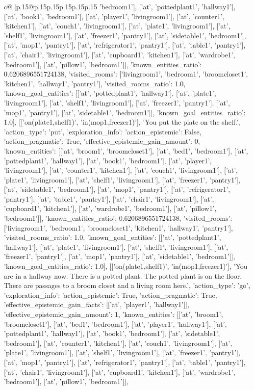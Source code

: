 \documentclass{article}
\begin{document}
{\begin{supertabular}{c@{$\;$}|p{.15\linewidth}@{}p{.15\linewidth}p{.15\linewidth}p{.15\linewidth}p{.15\linewidth}p{.15\linewidth}}
{{{'bedroom1'], ['at', 'pottedplant1', 'hallway1'], ['at', 'book1', 'bedroom1'], ['at', 'player1', 'livingroom1'], ['at', 'counter1', 'kitchen1'], ['at', 'couch1', 'livingroom1'], ['at', 'plate1', 'livingroom1'], ['at', 'shelf1', 'livingroom1'], ['at', 'freezer1', 'pantry1'], ['at', 'sidetable1', 'bedroom1'], ['at', 'mop1', 'pantry1'], ['at', 'refrigerator1', 'pantry1'], ['at', 'table1', 'pantry1'], ['at', 'chair1', 'livingroom1'], ['at', 'cupboard1', 'kitchen1'], ['at', 'wardrobe1', 'bedroom1'], ['at', 'pillow1', 'bedroom1']], 'known_entities_ratio': 0.6206896551724138, 'visited_rooms': ['livingroom1', 'bedroom1', 'broomcloset1', 'kitchen1', 'hallway1', 'pantry1'], 'visited_rooms_ratio': 1.0, 'known_goal_entities': [['at', 'pottedplant1', 'hallway1'], ['at', 'plate1', 'livingroom1'], ['at', 'shelf1', 'livingroom1'], ['at', 'freezer1', 'pantry1'], ['at', 'mop1', 'pantry1'], ['at', 'sidetable1', 'bedroom1']], 'known_goal_entities_ratio': 1.0}}], [['on(plate1,shelf1)', 'in(mop1,freezer1)'], 'You put the plate on the shelf.', {'action_type': 'put', 'exploration_info': {'action_epistemic': False, 'action_pragmatic': True, 'effective_epistemic_gain_amount': 0, 'known_entities': [['at', 'broom1', 'broomcloset1'], ['at', 'bed1', 'bedroom1'], ['at', 'pottedplant1', 'hallway1'], ['at', 'book1', 'bedroom1'], ['at', 'player1', 'livingroom1'], ['at', 'counter1', 'kitchen1'], ['at', 'couch1', 'livingroom1'], ['at', 'plate1', 'livingroom1'], ['at', 'shelf1', 'livingroom1'], ['at', 'freezer1', 'pantry1'], ['at', 'sidetable1', 'bedroom1'], ['at', 'mop1', 'pantry1'], ['at', 'refrigerator1', 'pantry1'], ['at', 'table1', 'pantry1'], ['at', 'chair1', 'livingroom1'], ['at', 'cupboard1', 'kitchen1'], ['at', 'wardrobe1', 'bedroom1'], ['at', 'pillow1', 'bedroom1']], 'known_entities_ratio': 0.6206896551724138, 'visited_rooms': ['livingroom1', 'bedroom1', 'broomcloset1', 'kitchen1', 'hallway1', 'pantry1'], 'visited_rooms_ratio': 1.0, 'known_goal_entities': [['at', 'pottedplant1', 'hallway1'], ['at', 'plate1', 'livingroom1'], ['at', 'shelf1', 'livingroom1'], ['at', 'freezer1', 'pantry1'], ['at', 'mop1', 'pantry1'], ['at', 'sidetable1', 'bedroom1']], 'known_goal_entities_ratio': 1.0}}], [['on(plate1,shelf1)', 'in(mop1,freezer1)'], 'You are in a hallway now. There is a potted plant. The potted plant is on the floor. There are passages to a broom closet and a living room here.', {'action_type': 'go', 'exploration_info': {'action_epistemic': True, 'action_pragmatic': True, 'effective_epistemic_gain_facts': [['at', 'player1', 'hallway1']], 'effective_epistemic_gain_amount': 1, 'known_entities': [['at', 'broom1', 'broomcloset1'], ['at', 'bed1', 'bedroom1'], ['at', 'player1', 'hallway1'], ['at', 'pottedplant1', 'hallway1'], ['at', 'book1', 'bedroom1'], ['at', 'sidetable1', 'bedroom1'], ['at', 'counter1', 'kitchen1'], ['at', 'couch1', 'livingroom1'], ['at', 'plate1', 'livingroom1'], ['at', 'shelf1', 'livingroom1'], ['at', 'freezer1', 'pantry1'], ['at', 'mop1', 'pantry1'], ['at', 'refrigerator1', 'pantry1'], ['at', 'table1', 'pantry1'], ['at', 'chair1', 'livingroom1'], ['at', 'cupboard1', 'kitchen1'], ['at', 'wardrobe1', 'bedroom1'], ['at', 'pillow1', 'bedroom1']], }}}
\end{supertabular}}
\end{document}

